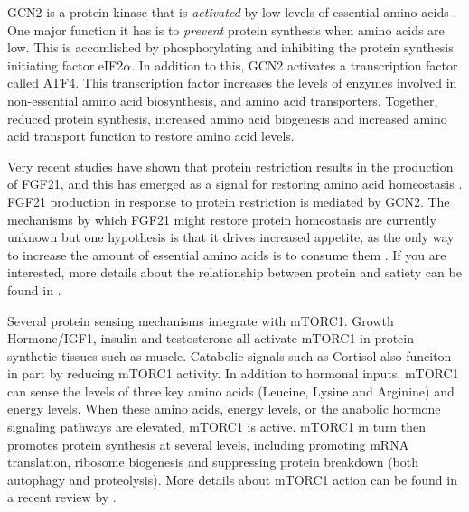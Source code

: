 \documentclass{tufte-handout}
\begin{document}
  GCN2 is a protein kinase that is \emph{activated} by low levels of essential amino acids \citep{Castilho2014}.  One major function it has is to \emph{prevent} protein synthesis when amino acids are low.  This is accomlished by phosphorylating and inhibiting the protein synthesis initiating factor eIF2$\alpha$.  In addition to this, GCN2 activates a transcription factor called ATF4.  This transcription factor increases the levels of enzymes involved in non-essential amino acid biosynthesis, and amino acid transporters.  Together, reduced protein synthesis, increased amino acid biogenesis and increased amino acid transport function to restore amino acid levels.  

  Very recent studies have shown that protein restriction results in the production of FGF21, and this has emerged as a signal for restoring amino acid homeostasis \citep{Laeger2014}.  FGF21 production in response to protein restriction is mediated by GCN2.  The mechanisms by which FGF21 might restore protein homeostasis are currently unknown but one hypothesis is that it drives increased appetite, as the only way to increase the amount of essential amino acids is to consume them \citep{Solon-Biet2016a}.  If you are interested, more details about the relationship between protein and satiety can be found in \citet{Morrison2015}.

  Several protein sensing mechanisms integrate with mTORC1.  Growth Hormone/IGF1, insulin and testosterone all activate mTORC1 in protein synthetic tissues such as muscle.  Catabolic signals such as Cortisol also funciton in part by reducing mTORC1 activity.  In addition to hormonal inputs, mTORC1 can sense the levels of three key amino acids (Leucine, Lysine and Arginine) and energy levels.  When these amino acids, energy levels, or the anabolic hormone signaling pathways are elevated, mTORC1 is active.  mTORC1 in turn then promotes protein synthesis at several levels, including promoting mRNA translation, ribosome biogenesis and suppressing protein breakdown (both autophagy and proteolysis).  More details about mTORC1 action can be found in a recent review by \citet{Saxton2017}.
\end{document}

